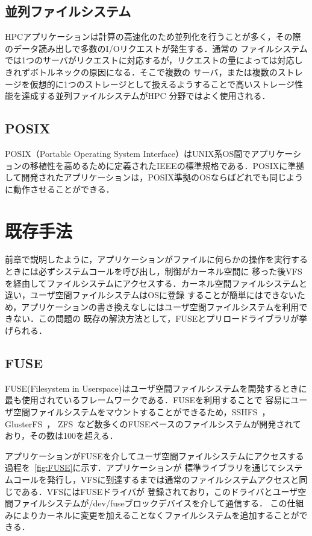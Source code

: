 \documentclass[a4paper,11pt]{jreport}
\begin{document}
\section{並列ファイルシステム}
HPCアプリケーションは計算の高速化のため並列化を行うことが多く，その際のデータ読み出しで多数のI/Oリクエストが発生する．通常の
ファイルシステムでは1つのサーバがリクエストに対応するが，リクエストの量によっては対応しきれずボトルネックの原因になる．そこで複数の
サーバ，または複数のストレージを仮想的に1つのストレージとして扱えるようすることで高いストレージ性能を達成する並列ファイルシステムがHPC
分野ではよく使用される．
\section{POSIX}
POSIX（Portable Operating System Interface）はUNIX系OS間でアプリケーションの移植性を高めるために定義されたIEEEの標準規格である．POSIXに準拠して開発されたアプリケーションは，POSIX準拠のOSならばどれでも同じように動作させることができる．
\chapter{既存手法}
前章で説明したように，アプリケーションがファイルに何らかの操作を実行するときには必ずシステムコールを呼び出し，制御がカーネル空間に
移った後VFSを経由してファイルシステムにアクセスする．カーネル空間ファイルシステムと違い，ユーザ空間ファイルシステムはOSに登録
することが簡単にはできないため，アプリケーションの書き換えなしにはユーザ空間ファイルシステムを利用できない．この問題の
既存の解決方法として，FUSEとプリロードライブラリが挙げられる．
\section{FUSE}
FUSE(Filesystem in Userspace)はユーザ空間ファイルシステムを開発するときに最も使用されているフレームワークである．FUSEを利用することで
容易にユーザ空間ファイルシステムをマウントすることができるため，SSHFS~\cite{hoskins2006sshfs}，GlusterFS~\cite{davies2013scale}，
ZFS~\cite{rodeh2003zfs}など数多くのFUSEベースのファイルシステムが開発されており，その数は100を超える．

アプリケーションがFUSEを介してユーザ空間ファイルシステムにアクセスする過程を\figurename~\ref{fig:FUSE}に示す．アプリケーションが
標準ライブラリを通じてシステムコールを発行し，VFSに到達するまでは通常のファイルシステムアクセスと同じである．VFSにはFUSEドライバが
登録されており，このドライバとユーザ空間ファイルシステムが/dev/fuseブロックデバイスを介して通信する．
この仕組みによりカーネルに変更を加えることなくファイルシステムを追加することができる．
\end{document}
